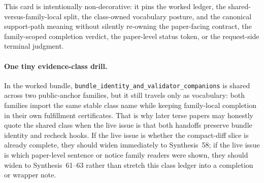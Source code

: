 \documentclass[11pt]{article}
\begin{document}
This card is intentionally non-decorative: it pins the worked ledger, the shared-versus-family-local split, the class-owned vocabulary posture, and the canonical support-path meaning without silently re-owning the paper-facing contract, the family-scoped completion verdict, the paper-level status token, or the request-side terminal judgment.\cite{series:workedexample}

\paragraph{One tiny evidence-class drill.}
In the worked bundle, \texttt{bundle\_identity\_and\_validator\_companions} is shared across two public-anchor families, but it still travels only as vocabulary: both families import the same stable class name while keeping family-local completion in their own fulfillment certificates. That is why later terse papers may honestly quote the shared class when the live issue is that both handoffs preserve bundle identity and recheck hooks. If the live issue is whether the compact-diff slice is already complete, they should widen immediately to Synthesis~58; if the live issue is which paper-level sentence or notice family readers were shown, they should widen to Synthesis~61--63 rather than stretch this class ledger into a completion or wrapper note.\cite{series:workedexample}
\end{document}
